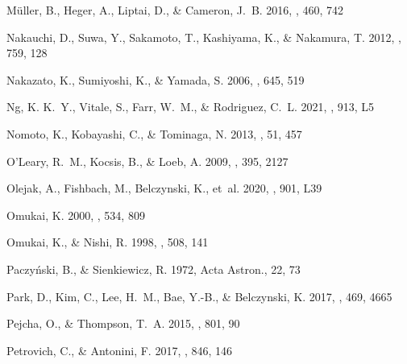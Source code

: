 \documentclass[pdftex]{pasj01}
\newcommand{\actaa}{Acta Astron.}
\begin{document}
\begin{thebibliography}{}
{M{\"u}ller}, B., {Heger}, A., {Liptai}, D., \& {Cameron}, J.~B. 2016, \mnras,
  460, 742

{Nakauchi}, D., {Suwa}, Y., {Sakamoto}, T., {Kashiyama}, K., \& {Nakamura}, T.
  2012, \apj, 759, 128

{Nakazato}, K., {Sumiyoshi}, K., \& {Yamada}, S. 2006, \apj, 645, 519

{Ng}, K. K.~Y., {Vitale}, S., {Farr}, W.~M., \& {Rodriguez}, C.~L. 2021, \apjl,
  913, L5

{Nomoto}, K., {Kobayashi}, C., \& {Tominaga}, N. 2013, \araa, 51, 457

{O'Leary}, R.~M., {Kocsis}, B., \& {Loeb}, A. 2009, \mnras, 395, 2127

{Olejak}, A., {Fishbach}, M., {Belczynski}, K., {et~al.} 2020, \apjl, 901, L39

{Omukai}, K. 2000, \apj, 534, 809

{Omukai}, K., \& {Nishi}, R. 1998, \apj, 508, 141

{Paczy{\'n}ski}, B., \& {Sienkiewicz}, R. 1972, \actaa, 22, 73

{Park}, D., {Kim}, C., {Lee}, H.~M., {Bae}, Y.-B., \& {Belczynski}, K. 2017,
  \mnras, 469, 4665

{Pejcha}, O., \& {Thompson}, T.~A. 2015, \apj, 801, 90

{Petrovich}, C., \& {Antonini}, F. 2017, \apj, 846, 146


\end{thebibliography}
\end{document}
